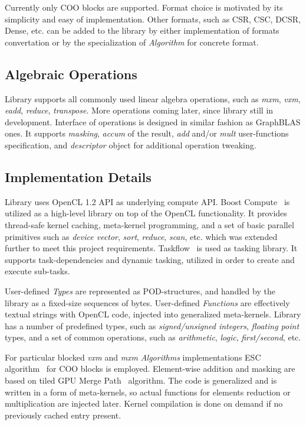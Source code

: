 Currently only COO blocks are supported. Format choice is motivated by its simplicity and easy of implementation. 
Other formats, such as CSR, CSC, DCSR, Dense, etc. can be added to the library by either implementation of formats convertation or by the specialization of \textit{Algorithm} for concrete format.

\subsection{Algebraic Operations}

Library supports all commonly used linear algebra operations, such as \textit{mxm}, \textit{vxm}, \textit{eadd}, \textit{reduce}, \textit{transpose}. 
More operations coming later, since library still in development.
Interface of operations is designed in similar fashion as GraphBLAS ones. 
It supports \textit{masking}, \textit{accum} of the result, \textit{add} and/or \textit{mult} user-functions specification, and \textit{descriptor} object for additional operation tweaking.

\subsection{Implementation Details}

Library uses OpenCL 1.2 API as underlying compute API. 
Boost Compute~\cite{10.1145/2909437.2909454:boost:compute} is utilized as a high-level library on top of the OpenCL functionality. 
It provides thread-safe kernel caching, meta-kernel programming, and a set of basic parallel primitives such as \textit{device vector}, \textit{sort}, \textit{reduce}, \textit{scan}, etc. which was extended further to meet this project requirements.
Taskflow~\cite{Huang2022TaskflowAL} is used as tasking library. It supports task-dependencies and dynamic tasking, utilized in order to create and execute sub-tasks. 

User-defined \textit{Types} are represented as POD-structures, and handled by the library as a fixed-size sequences of bytes.
User-defined \textit{Functions} are effectively textual strings with OpenCL code, injected into generalized meta-kernels.
Library has a number of predefined types, such as \textit{signed/unsigned integers}, \textit{floating point} types, and a set of common operations, such as \textit{arithmetic}, \textit{logic}, \textit{first/second}, etc.

For particular blocked \textit{vxm} and \textit{mxm} \textit{Algorithms} implementations ESC algorithm~\cite{10.1145/2699470:esc:algo} for COO blocks is employed. 
Element-wise addition and masking are based on tiled GPU Merge Path~\cite{inproceedings:gpu_merge_path} algorithm. 
The code is generalized and is written in a form of meta-kernels, so actual functions for elements reduction or multiplication are injected later.
Kernel compilation is done on demand if no previously cached entry present.

